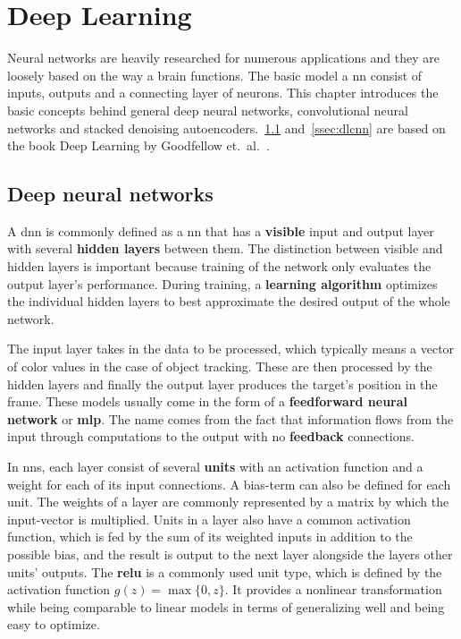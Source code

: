 \section{Deep Learning}
Neural networks are heavily researched for numerous applications and they are loosely
based on the way a brain functions. The basic model a \ac{nn} consist of inputs, outputs
and a connecting layer of neurons. This chapter introduces the basic concepts behind
general deep neural networks, convolutional neural networks and stacked denoising
autoencoders.~\ref{ssec:dldnn} and~\ref{ssec:dlcnn} are based on the book Deep Learning by
Goodfellow et.~al.~\cite{DEEP_LEARNING}.

\subsection{Deep neural networks}\label{ssec:dldnn}

A \ac{dnn} is commonly defined as a \ac{nn} that has a \textbf{visible} input and
output layer with several \textbf{hidden layers} between them. The distinction between
visible and hidden layers is important because training of the network only evaluates
the output layer's performance. During training, a \textbf{learning algorithm} optimizes
the individual hidden layers to best approximate the desired output of the whole network.

The input layer takes in the data to be processed, which typically means a vector of
color values in the case of object tracking. These are then processed by the hidden
layers and finally the output layer produces the target's position in the frame. These
models usually come in the form of a \textbf{feedforward neural network} or
\textbf{\ac{mlp}}. The name comes from the fact that information flows from the input
through computations to the output with no \textbf{feedback} connections.

In \ac{nn}s, each layer consist of several \textbf{units} with an activation function
and a weight for each of its input connections. A bias-term can also be defined for
each unit. The weights of a layer are commonly represented by a matrix by which the
input-vector is multiplied. Units in a layer also have a common activation function,
which is fed by the sum of its weighted inputs in addition to the possible bias, and
the result is output to the next layer alongside the layers other units' outputs.
The \textbf{\ac{relu}} is a commonly used unit type, which is defined by the activation
function $g (z) = \max\{0,z\}$. It provides a nonlinear transformation while being
comparable to linear models in terms of generalizing well and being easy to optimize.

